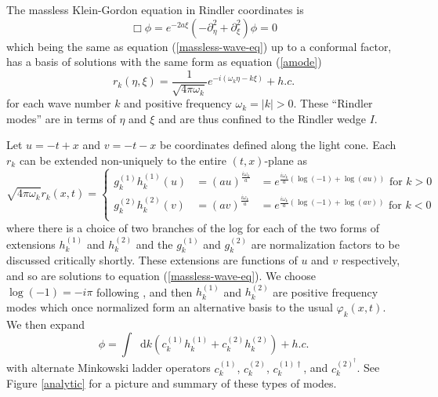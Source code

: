 \documentclass[12pt,a4paper]{article}
\newcommand*\diff{\mathop{}\!\mathrm{d}}
\begin{document}
The massless Klein-Gordon equation in Rindler coordinates is
\begin{equation}
  \Box \phi = e^{-2a \xi}(-\partial_\eta^2 + \partial_\xi^2) \phi = 0
\end{equation}
which being the same as equation (\ref{massless-wave-eq}) up to a conformal factor, has a basis of solutions with the same form as equation (\ref{amode})
\begin{equation}
 r_k(\eta,\xi) = \frac{1}{\sqrt{4 \pi \omega_k}} e^{-i(\omega_k \eta -k \xi)} + h.c.
\end{equation}
for each wave number $k$ and positive frequency $\omega_k = |k| > 0$.  These ``Rindler modes'' are in terms of $\eta$ and $\xi$ and are thus confined to the Rindler wedge $I$.


Let $u = -t + x$ and $v = -t - x$ be coordinates defined along the light cone.  Each $r_k$ can be extended non-uniquely to the entire $(t,x)$-plane as
\begin{equation}
  \sqrt{4 \pi \omega_k} r_k(x,t) = \left\{\begin{array}{lll}
      g_k^{(1)} h_k^{(1)}(u)&={(au)}^{\frac{i\omega_k}{a}} &=  e^{\frac{i\omega_k}{a} \left(\log(-1) + \log(au)\right)} \text{ for } k>0\\
      g_k^{(2)} h_k^{(2)}(v)&={(av)}^{\frac{i\omega_k}{a}} &= e^{\frac{i\omega_k}{a} \left(\log(-1) + \log(av)\right)} \text{ for } k<0\\  
    \end{array}\right.
\end{equation}
where there is a choice of two branches of the log for each of the two forms of extensions $h_k^{(1)}$ and $h_k^{(2)}$ and the $g_k^{(1)}$ and $g_k^{(2)}$ are normalization factors to be discussed critically shortly. These extensions are functions of $u$ and $v$ respectively, and so are solutions to equation (\ref{massless-wave-eq}). We choose $\log(-1) = -i \pi$ following \cite{Frodden}, and then $h_k^{(1)}$ and $h_k^{(2)}$ are positive frequency modes which once normalized form an alternative basis to the usual $\varphi_k(x,t)$. We then expand
\begin{equation}
  \phi = \int \diff k( c_k^{(1)} h_k^{(1)} + c_k^{(2)} h_k^{(2)}) + h.c.  
\end{equation}
with alternate Minkowski ladder operators $c_k^{(1)}$, $c_k^{(2)}$, $c_k^{(1)\dagger}$, and $c_k^{(2)^\dagger}$. See Figure \ref{analytic} for a picture and summary of these types of modes.
\end{document}

